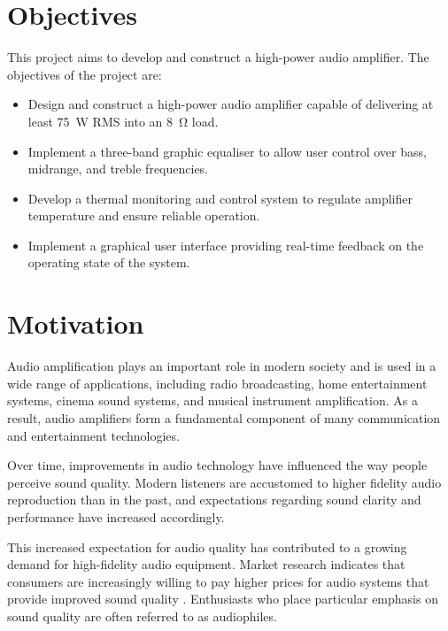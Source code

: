 \documentclass[12pt,a4paper]{report}
\begin{document}
	\section{Objectives}
	
	This project aims to develop and construct a high-power audio amplifier. The objectives of the project are:
	
	\begin{itemize}
		\item Design and construct a high-power audio amplifier capable of delivering at least \SI{75}{\watt} RMS into an \SI{8}{\ohm} load.
		
		\item Implement a three-band graphic equaliser to allow user control over bass, midrange, and treble frequencies.
		
		\item Develop a thermal monitoring and control system to regulate amplifier temperature and ensure reliable operation.
		
		\item Implement a graphical user interface providing real-time feedback on the operating state of the system.
	\end{itemize}
	
	\section{Motivation}
	
	Audio amplification plays an important role in modern society and is used in a wide range of applications, including radio broadcasting, home entertainment systems, cinema sound systems, and musical instrument amplification. As a result, audio amplifiers form a fundamental component of many communication and entertainment technologies.
	
	Over time, improvements in audio technology have influenced the way people perceive sound quality. Modern listeners are accustomed to higher fidelity audio reproduction than in the past, and expectations regarding sound clarity and performance have increased accordingly.
	
	This increased expectation for audio quality has contributed to a growing demand for high-fidelity audio equipment. Market research indicates that consumers are increasingly willing to pay higher prices for audio systems that provide improved sound quality \cite{audiophile_market_growth}. Enthusiasts who place particular emphasis on sound quality are often referred to as audiophiles.
	
\end{document}
